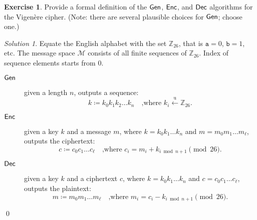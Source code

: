 \documentclass[titlepage,reqno]{amsart}
\theoremstyle{definition}
\newtheorem{exercise}{Exercise}[section]
\theoremstyle{remark}
\newtheorem*{solution}{Solution}
\newcommand{\assign}{\coloneq}
\newcommand{\ugets}{\overset{\text{u}}{\gets}}
\newcommand{\Z}{\mathbb{Z}}
\begin{document}
\begin{exercise}
    Provide a formal definition of the $\mathsf{Gen}$, $\mathsf{Enc}$, and $\mathsf{Dec}$ algorithms for the Vigen\`ere cipher.
    (Note: there are several plausible choices for $\mathsf{Gen}$; choose one.)

    \begin{solution}
        Equate the English alphabet with the set $\Z_{26}$, that is $\mathtt{a} = 0$, $\mathtt{b} = 1$, etc.
        The message space $\mathcal{M}$ consists of all finite sequences of $\Z_{26}$.
        Index of sequence elements starts from $0$.
        \begin{description}
            \item[$\mathsf{Gen}$] given a length $n$, outputs a sequence:
                \begin{equation*}
                    k \assign k_0 k_1 k_2 \dots k_n \quad \text{,where $k_i \ugets \Z_{26}$.}
                \end{equation*}

            \item[$\mathsf{Enc}$] given a key $k$ and a message $m$, where
                $k = k_0 k_1 \dots k_n$ and $m = m_0 m_1 \dots m_\ell$,
                outputs the ciphertext:
                \begin{equation*}
                    c \assign c_0 c_1 \dots c_\ell \quad 
                    \text{,where $c_i = m_i + k_{i \bmod{n+1}} \pmod{26}$}.
                \end{equation*}
            \item[$\mathsf{Dec}$] given a key $k$ and a ciphertext $c$, where
                $k = k_0 k_1 \dots k_n$ and $c = c_0 c_1 \dots c_\ell$,
                outputs the plaintext:
                \begin{equation*}
                    m \assign m_0 m_1 \dots m_\ell \quad
                    \text{,where $m_i = c_i - k_{i \bmod{n+1}} \pmod{26}$}.
                \end{equation*}
        \end{description}
        \qed
    \end{solution}
\end{exercise}
\end{document}
